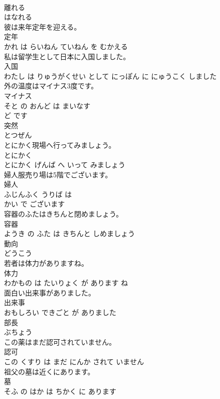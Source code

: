 \documentclass[8pt]{extreport}
\begin{document}
\begin{CJK}{UTF8}{min}
\\	離れる	
\\	はなれる			
\\	彼は来年定年を迎える。	
\\	定年 
\\	かれ は らいねん ていねん を むかえる			
\\	私は留学生として日本に入国しました。	
\\	入国 
\\	わたし は りゅうがくせい として にっぽん に にゅうこく しました			
\\	外の温度はマイナス3度です。	
\\	マイナス 
\\	そと の おんど は まいなす 
\\	ど です			
\\	突然	
\\	とつぜん			
\\	とにかく現場へ行ってみましょう。	
\\	とにかく 
\\	とにかく げんば へ いって みましょう			
\\	婦人服売り場は5階でございます。	
\\	婦人 
\\	ふじんふく うりば は 
\\	かい で ございます			
\\	容器のふたはきちんと閉めましょう。	
\\	容器 
\\	ようき の ふた は きちんと しめましょう			
\\	動向	
\\	どうこう			
\\	若者は体力がありますね。	
\\	体力 
\\	わかもの は たいりょく が あります ね			
\\	面白い出来事がありました。	
\\	出来事 
\\	おもしろい できごと が ありました			
\\	部長	
\\	ぶちょう			
\\	この薬はまだ認可されていません。	
\\	認可 
\\	この くすり は まだ にんか されて いません			
\\	祖父の墓は近くにあります。	
\\	墓 
\\	そふ の はか は ちかく に あります			

\end{CJK}
\end{document}
